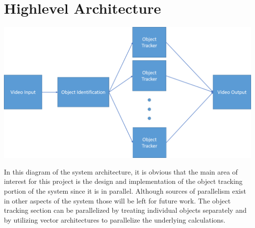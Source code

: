 \chapter*{Highlevel Architecture}

\includegraphics[width=\textwidth]{./arch.png}

In this diagram of the system architecture, it is obvious that the main area of interest for this project is the design and implementation of the object tracking portion of the system since it is in parallel. Although sources of parallelism exist in other aspects of the system those will be left for future work. The object tracking section can be parallelized by treating individual objects separately and by utilizing vector architectures to parallelize the underlying calculations.